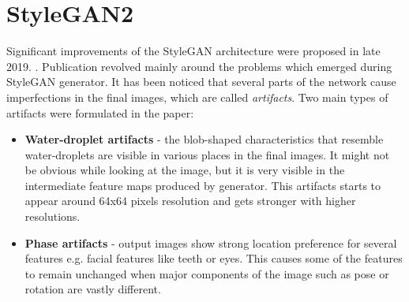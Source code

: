 \documentclass[12pt,a4paper,openany]{book}
\begin{document}




\section{StyleGAN2}

\noindent Significant improvements of the StyleGAN architecture were proposed in late 2019. \cite{stylegan2}. Publication revolved mainly around the problems which emerged during StyleGAN generator. It has been noticed that several parts of the network cause imperfections in the final images, which are called \textit{artifacts}. Two main types of artifacts were formulated in the paper:

\begin{itemize}
\item \textbf{Water-droplet artifacts} - the blob-shaped characteristics that resemble water-droplets are visible in various places in the final images. It might not be obvious while looking at the image, but it is very visible in the intermediate feature maps produced by generator. This artifacts starts to appear around 64x64 pixels resolution and gets stronger with higher resolutions. 
\item \textbf{Phase artifacts} - output images show strong location preference for several features e.g. facial features like teeth or eyes. This causes some of the features to remain unchanged when major components of the image such as pose or rotation are vastly different.
\end{itemize}
\end{document}
